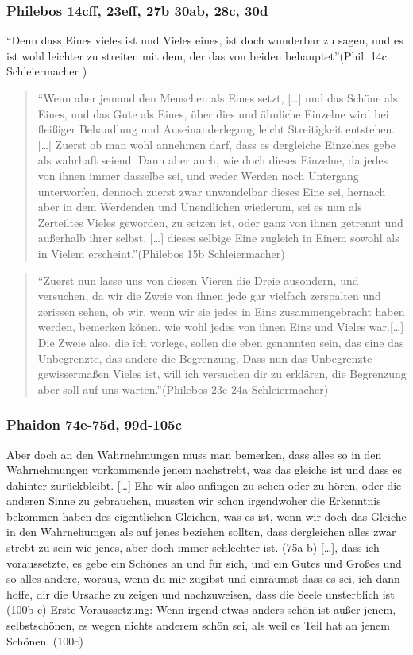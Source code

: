 \documentclass[12pt]{article}
\newcommand*{\zitatblock}[1]{%
    \begin{quote}
    \fontsize{10}{12}\selectfont
    \setlength{\parskip}{1.0em}
    #1
    \end{quote}
}
\begin{document}
\subsubsection{Philebos 14cff, 23eff, 27b 30ab, 28c, 30d}
\enquote{Denn dass Eines vieles ist und Vieles eines, ist doch wunderbar zu sagen, und es ist wohl leichter zu streiten mit dem, der das von beiden behauptet}(Phil. 14c Schleiermacher \nocite{PhilebosSchleiermacher})
\zitatblock{\enquote{Wenn aber jemand den Menschen als Eines setzt, [\dots] und das Schöne als Eines, und das Gute als Eines, über dies und ähnliche Einzelne wird bei fleißiger Behandlung und Auseinanderlegung leicht Streitigkeit entstehen.[\dots] Zuerst ob man wohl annehmen darf, dass es dergleiche Einzelnes gebe als wahrhaft seiend. Dann aber auch, wie doch dieses Einzelne, da jedes von ihnen immer dasselbe sei, und weder Werden noch Untergang unterworfen, dennoch zuerst zwar unwandelbar dieses Eine sei, hernach aber in dem Werdenden und Unendlichen wiederum, sei es nun als Zerteiltes Vieles geworden, zu setzen ist, oder ganz von ihnen getrennt und außerhalb ihrer selbst, [\dots] dieses selbige Eine zugleich in Einem sowohl als in Vielem erscheint.}(Philebos 15b Schleiermacher)}
\zitatblock{\enquote{Zuerst nun lasse uns von diesen Vieren die Dreie ausondern, und versuchen, da wir die Zweie von ihnen jede gar vielfach zerspalten und zerissen sehen, ob wir, wenn wir sie jedes in Eins zusammengebracht haben werden, bemerken könen, wie wohl jedes von ihnen Eins und Vieles war.[\dots] Die Zweie also, die ich vorlege, sollen die eben genannten sein, das eine das Unbegrenzte, das andere die Begrenzung. Dass nun das Unbegrenzte gewissermaßen Vieles ist, will ich versuchen dir zu erklären, die Begrenzung aber soll auf uns warten.}(Philebos 23e-24a Schleiermacher)}



\subsubsection{Phaidon 74e-75d, 99d-105c}
Aber doch an den Wahrnehmungen muss man bemerken, dass alles so in den Wahrnehmungen vorkommende jenem nachstrebt, was das gleiche ist und dass es dahinter zurückbleibt. [\dots] Ehe wir also anfingen zu sehen oder zu hören, oder die anderen Sinne zu gebrauchen, mussten wir schon irgendwoher die Erkenntnis bekommen haben des eigentlichen Gleichen, was es ist, wenn wir doch das Gleiche in den Wahrnehumgen als auf jenes beziehen sollten, dass dergleichen alles zwar strebt zu sein wie jenes, aber doch immer schlechter ist. (75a-b) 
[\dots], dass ich voraussetzte, es gebe ein Schönes an und für sich, und ein Gutes und Großes und so alles andere, woraus, wenn du mir zugibst und einräumst dass es sei, ich dann hoffe, dir die Ursache zu zeigen und nachzuweisen, dass die Seele unsterblich ist (100b-c)
Erste Voraussetzung: Wenn irgend etwas anders schön ist außer jenem, selbstschönen, es wegen nichts anderem schön sei, als weil es Teil hat an jenem Schönen. (100c)
\end{document}
